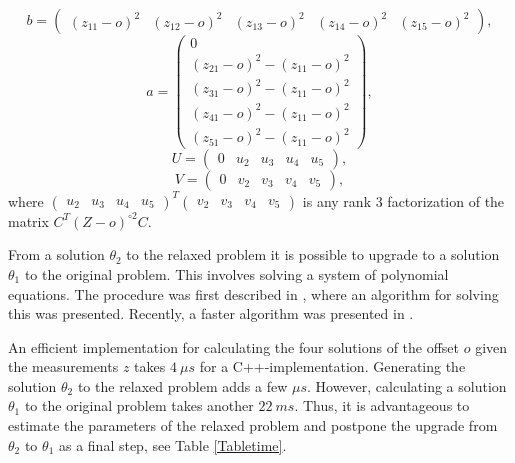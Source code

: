\documentclass[
]{book}
\begin{document}
\begin{equation*}
\! b \! = \! \begin{pmatrix} (z_{11} \! - \! o)^2  \! \!  &  \! \!  (z_{12}-o)^2  \! \!  &  \! \!  (z_{13}-o)^2 \! \!  &  \! \!   (z_{14}-o)^2 \! \!  &  \! \!   (z_{15}-o)^2 \end{pmatrix} \! ,
\end{equation*}
\begin{equation}
a =  \begin{pmatrix} 0 \\ (z_{21}-o)^2 -(z_{11}-o)^2\\ (z_{31}-o)^2 -(z_{11}-o)^2 \\ (z_{41}-o)^2 -(z_{11}-o)^2 \\ (z_{51}-o)^2 -(z_{11}-o)^2 \end{pmatrix},
\end{equation}
\begin{equation}
U =  \begin{pmatrix} 0 & u_2 & u_3 & u_4 & u_5\end{pmatrix}, 
\end{equation}
\begin{equation}
V =  \begin{pmatrix}0 & v_2 & v_3 & v_4 & v_5\end{pmatrix} ,
\end{equation}
where \(\begin{pmatrix}u_2 & u_3 & u_4 & u_5\end{pmatrix}^T \begin{pmatrix} v_2 & v_3 & v_4 & v_5\end{pmatrix}\) is any rank \(3\) factorization of the matrix \(C^T (Z-o)^{\circ 2} C\).

From a solution \(\theta_2\) to the relaxed problem it is possible to upgrade to a solution \(\theta_1\) to the original problem. This involves solving a system of polynomial equations. The procedure was first described in \cite{kuang-burgess-etal-icassp-13}, where an algorithm for solving this was presented. Recently, a faster algorithm was presented in \cite{larsson2017polynomial}.

An efficient implementation for calculating the four solutions of the offset \(o\) given the measurements \(z\) takes \(4~ \mu s\) for a C++-implementation. Generating the solution \(\theta_2\) to the relaxed problem adds a few \(\mu s\). However, calculating a solution \(\theta_1\) to the original problem takes another \(22 ~ms\). Thus, it is advantageous to estimate the parameters of the relaxed problem and postpone the upgrade from \(\theta_2\) to \(\theta_1\) as a final step, see Table \ref{Tabletime}.
\end{document}
